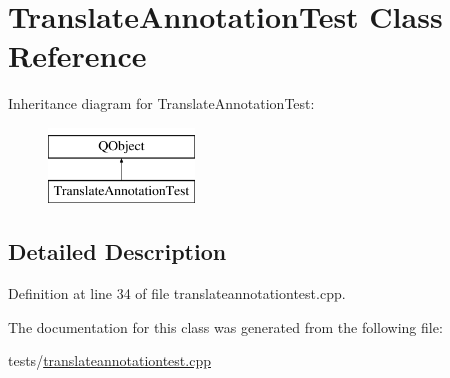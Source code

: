\hypertarget{classTranslateAnnotationTest}{\section{Translate\+Annotation\+Test Class Reference}
\label{classTranslateAnnotationTest}
}
Inheritance diagram for Translate\+Annotation\+Test\+:\begin{figure}[H]
\begin{center}
\leavevmode
\includegraphics[height=2.000000cm]{classTranslateAnnotationTest}
\end{center}
\end{figure}


\subsection{Detailed Description}


Definition at line 34 of file translateannotationtest.\+cpp.



The documentation for this class was generated from the following file\+:\begin{DoxyCompactItemize}
\item 
tests/\hyperlink{translateannotationtest_8cpp}{translateannotationtest.\+cpp}\end{DoxyCompactItemize}
